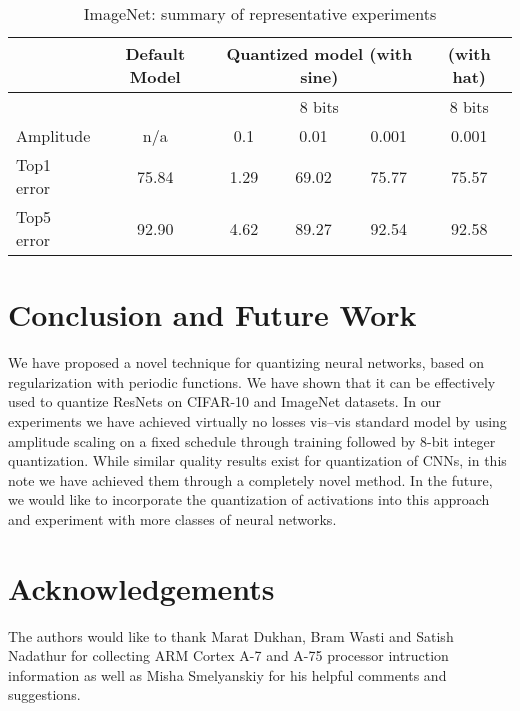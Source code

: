 \documentclass{article}
\newcommand{\squeeze}{\vspace{-2.5mm}}
\begin{document}
\begin{table}[h]
\centering
\begin{tabular}{l|c|c|c|c|c|}
          & Default Model & \multicolumn{3}{c|}{Quantized model (with sine)} & (with hat) \\
\hline
                &         & \multicolumn{3}{c|}{8 bits} & 8 bits \\
\hline
Amplitude       &  n/a    & 0.1   & 0.01  & 0.001   & 0.001 \\
\hline
Top1 error      & 75.84   & 1.29 & 69.02 & 75.77   & 75.57  \\
Top5 error      & 92.90   & 4.62 & 89.27 & 92.54   & 92.58  \\
\end{tabular}
\caption{ImageNet: summary of representative experiments}
\label{tab:imagenet_summary}
\squeeze
\end{table}


\section{Conclusion and Future Work}

We have proposed a novel technique for quantizing neural networks, based on regularization with periodic functions. We have shown that it can be effectively used to quantize ResNets on CIFAR-10 and ImageNet datasets. In our experiments we have achieved virtually no losses vis--vis standard model by using amplitude scaling on a fixed schedule through training followed by 8-bit integer quantization. While similar quality results exist for quantization of CNNs, in this note we have achieved them through a completely novel method. In the future, we would like to incorporate the quantization of activations into this approach and experiment with more classes of neural networks.


\section*{Acknowledgements}

The authors would like to thank Marat Dukhan, Bram Wasti and Satish Nadathur for collecting ARM Cortex A-7 and A-75 processor intruction information as well as Misha Smelyanskiy for his helpful comments and suggestions.





\clearpage
\newpage
\end{document}
